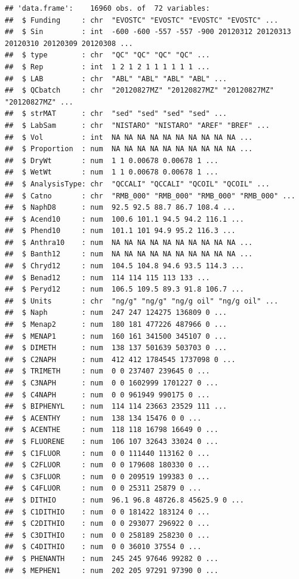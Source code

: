 \documentclass[]{article}
\begin{document}
\begin{verbatim}
## 'data.frame':    16960 obs. of  72 variables:
##  $ Funding     : chr  "EVOSTC" "EVOSTC" "EVOSTC" "EVOSTC" ...
##  $ Sin         : int  -600 -600 -557 -557 -900 20120312 20120313 20120310 20120309 20120308 ...
##  $ type        : chr  "QC" "QC" "QC" "QC" ...
##  $ Rep         : int  1 2 1 2 1 1 1 1 1 1 ...
##  $ LAB         : chr  "ABL" "ABL" "ABL" "ABL" ...
##  $ QCbatch     : chr  "20120827MZ" "20120827MZ" "20120827MZ" "20120827MZ" ...
##  $ strMAT      : chr  "sed" "sed" "sed" "sed" ...
##  $ LabSam      : chr  "NISTARO" "NISTARO" "AREF" "BREF" ...
##  $ Vol         : int  NA NA NA NA NA NA NA NA NA NA ...
##  $ Proportion  : num  NA NA NA NA NA NA NA NA NA NA ...
##  $ DryWt       : num  1 1 0.00678 0.00678 1 ...
##  $ WetWt       : num  1 1 0.00678 0.00678 1 ...
##  $ AnalysisType: chr  "QCCALI" "QCCALI" "QCOIL" "QCOIL" ...
##  $ Catno       : chr  "RMB_000" "RMB_000" "RMB_000" "RMB_000" ...
##  $ NaphD8      : num  92.5 92.5 88.7 86.7 108.4 ...
##  $ Acend10     : num  100.6 101.1 94.5 94.2 116.1 ...
##  $ Phend10     : num  101.1 101 94.9 95.2 116.3 ...
##  $ Anthra10    : num  NA NA NA NA NA NA NA NA NA NA ...
##  $ Banth12     : num  NA NA NA NA NA NA NA NA NA NA ...
##  $ Chryd12     : num  104.5 104.8 94.6 93.5 114.3 ...
##  $ Benad12     : num  114 114 115 113 133 ...
##  $ Peryd12     : num  106.5 109.5 89.3 91.8 106.7 ...
##  $ Units       : chr  "ng/g" "ng/g" "ng/g oil" "ng/g oil" ...
##  $ Naph        : num  247 247 124275 136809 0 ...
##  $ Menap2      : num  180 181 477226 487966 0 ...
##  $ MENAP1      : num  160 161 341500 345107 0 ...
##  $ DIMETH      : num  138 137 501639 503703 0 ...
##  $ C2NAPH      : num  412 412 1784545 1737098 0 ...
##  $ TRIMETH     : num  0 0 237407 239645 0 ...
##  $ C3NAPH      : num  0 0 1602999 1701227 0 ...
##  $ C4NAPH      : num  0 0 961949 990175 0 ...
##  $ BIPHENYL    : num  114 114 23663 23529 111 ...
##  $ ACENTHY     : num  138 134 15476 0 0 ...
##  $ ACENTHE     : num  118 118 16798 16649 0 ...
##  $ FLUORENE    : num  106 107 32643 33024 0 ...
##  $ C1FLUOR     : num  0 0 111440 113162 0 ...
##  $ C2FLUOR     : num  0 0 179608 180330 0 ...
##  $ C3FLUOR     : num  0 0 209519 199383 0 ...
##  $ C4FLUOR     : num  0 0 25311 25879 0 ...
##  $ DITHIO      : num  96.1 96.8 48726.8 45625.9 0 ...
##  $ C1DITHIO    : num  0 0 181422 183124 0 ...
##  $ C2DITHIO    : num  0 0 293077 296922 0 ...
##  $ C3DITHIO    : num  0 0 258189 258230 0 ...
##  $ C4DITHIO    : num  0 0 36010 37554 0 ...
##  $ PHENANTH    : num  245 245 97646 99282 0 ...
##  $ MEPHEN1     : num  202 205 97291 97390 0 ...

\end{verbatim}
\end{document}
